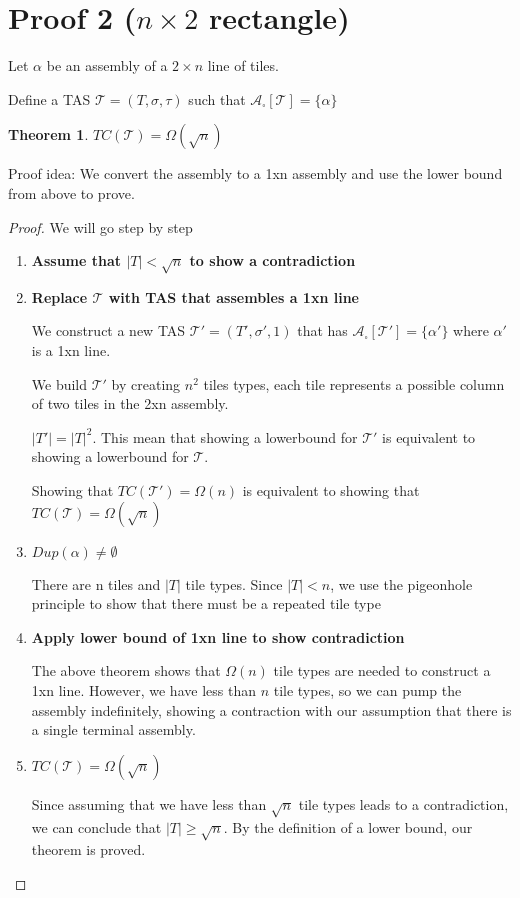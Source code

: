 \documentclass[12pt]{article}
\newtheorem{theorem}{Theorem}
\begin{document}
\section*{Proof 2 ($n \times 2 $ rectangle)}

Let $\alpha$ be an assembly of a $2 \times n$ line of tiles.

Define a TAS $\mathcal{T} = (T, \sigma, \tau)$ such that $\mathcal{A}_\square[\mathcal{T}] = \{ \alpha \}$

\begin{theorem}
	$TC(\mathcal{T}) = \Omega(\sqrt{n})$
\end{theorem}

Proof idea: We convert the assembly to a 1xn assembly and use the lower bound from above to prove. 

\begin{proof}
		We will go step by step
	\begin{enumerate}

		\item \textbf{Assume that $|T| < \sqrt{n}$ to show a contradiction}

        \item \textbf{Replace $\mathcal{T}$ with TAS that assembles a 1xn line}

            We construct a new TAS $\mathcal{T}' = (T', \sigma', 1)$ that has $\mathcal{A}_\square[\mathcal{T}'] = \{ \alpha' \}$ where $\alpha'$ is a 1xn line.

            We build $\mathcal{T}'$ by creating $n^2$ tiles types, each tile represents a possible column of two tiles in the 2xn assembly.

            $|T'| = |T|^2$. This mean that showing a lowerbound for $\mathcal{T}'$ is equivalent to showing a lowerbound for $\mathcal{T}$.

            Showing that $TC(\mathcal{T}') = \Omega(n)$ is equivalent to showing that $TC(\mathcal{T}) = \Omega(\sqrt{n})$


		\item \textbf{$Dup(\alpha) \neq \emptyset$}

            There are n tiles and $|T|$ tile types. Since $|T| < n$, we use the pigeonhole principle to show that there must be a repeated tile type

		\item \textbf{Apply lower bound of 1xn line to show contradiction}

            The above theorem shows that $\Omega(n)$ tile types are needed to construct a 1xn line. However, we have less than $n$ tile types, so we can pump the assembly indefinitely, showing a contraction with our assumption that there is a single terminal assembly.

		\item \textbf{$TC(\mathcal{T}) = \Omega(\sqrt{n})$}

            Since assuming that we have less than $\sqrt{n}$ tile types leads to a contradiction, we can conclude that $|T| \geq \sqrt{n}$. By the definition of a lower bound, our theorem is proved.

	\end{enumerate}
\end{proof}
\end{document}
